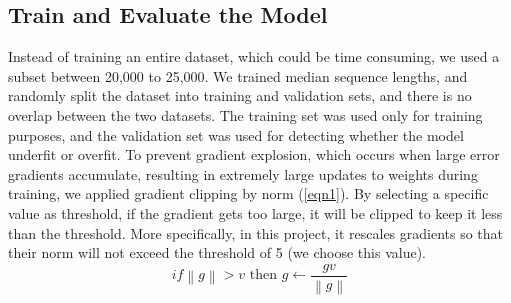 \documentclass[conference]{IEEEtran}
\begin{document}
\subsection{Train and Evaluate the Model}
Instead of training an entire dataset, which could be time consuming, we used a subset between 20,000 to 25,000. We trained median sequence lengths, and randomly split the dataset into training and validation sets, and there is no overlap between the two datasets. The training set was used only for training purposes, and the validation set was used for detecting whether the model underfit or overfit. To prevent gradient explosion, which occurs when large error gradients accumulate, resulting in extremely large updates to weights during training, we applied gradient clipping by norm (\ref{eqn1}). By selecting a specific value as threshold, if the gradient gets too large, it will be clipped to keep it less than the threshold. More specifically, in this project, it rescales gradients so that their norm will not exceed the threshold of 5 (we choose this value).
\begin{equation}
    \label{eqn1}
    if \left\| g \right\|\gt v \text{ then } g \gets \frac{gv}{\left\| g \right\|}
\end{equation}    
\end{document}
